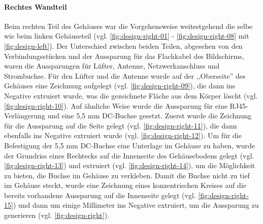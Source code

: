 \paragraph{Rechtes Wandteil}
Beim rechten Teil des Gehäuses war die Vorgehensweise weitestgehend die selbe wie beim linken Gehäuseteil (vgl. \ref{fig:design-right-01} - \ref{fig:design-right-08} mit \ref{fig:design-left}). 
Der Unterschied zwischen beiden Teilen, abgesehen von den Verbindungsstücken und der Aussparung für das Flachkabel des Bildschirms, waren die Aussparungen für Lüfter, Antenne, Netzwerkanschluss und Strombuchse. 
Für den Lüfter und die Antenne wurde auf der ,,Oberseite'' des Gehäuses eine Zeichnung aufgelegt (vgl. \ref{fig:design-right-09}), die dann ins Negative extruiert wurde, was die gezeichnete Fläche aus dem Körper löscht (vgl. \ref{fig:design-right-10}). 
Auf ähnliche Weise wurde die Aussparung für eine RJ45-Verlängerung und eine 5,5 mm DC-Buchse gesetzt. Zuerst wurde die Zeichnung für die Aussparung auf die Seite gelegt (vgl. \ref{fig:design-right-11}), die dann ebenfalls ins Negative extruiert wurde (vgl. \ref{fig:design-right-12}). 
Um für die Befestigung der 5,5 mm DC-Buchse eine Unterlage im Gehäuse zu haben, wurde der Grundriss eines Rechtecks auf die Innenseite des Gehäusebodens gelegt (vgl. \ref{fig:design-right-13}) und extruiert (vgl. \ref{fig:design-right-14}), um die Möglichkeit zu bieten, die Buchse im Gehäuse zu verkleben. 
Damit die Buchse nicht zu tief im Gehäuse steckt, wurde eine Zeichnung eines konzentrischen Kreises auf die bereits vorhandene Aussparung auf die Innenseite gelegt  (vgl. \ref{fig:design-right-15}) und dann um einige Millimeter ins Negative extruiert, um die Aussparung zu generieren (vgl. \ref{fig:design-right}).\par

